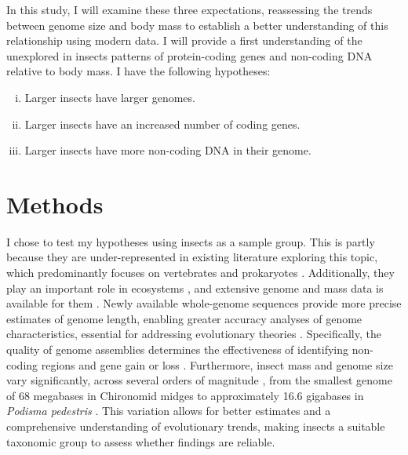 \documentclass[11pt]{article}
\begin{document}
In this study, I will examine these three expectations, reassessing the trends between genome size and body mass to establish a better understanding of this relationship using modern data. I will provide a first understanding of the unexplored in insects patterns of protein-coding genes and non-coding DNA relative to body mass. I have the following hypotheses:
\vspace{-0.25cm}
\begin{enumerate}[(i)]
    \setlength\itemsep{-0.1cm}
    \item Larger insects have larger genomes.
    \item Larger insects have an increased number of coding genes.
    \item Larger insects have more non-coding DNA in their genome.
\end{enumerate}

\pagebreak
\section{Methods}
I chose to test my hypotheses using insects as a sample group. This is partly because they are under-represented in existing literature exploring this topic, which predominantly focuses on vertebrates and prokaryotes \citep{genomeandmetabolism}. Additionally, they play an important role in ecosystems \citep{role-of-insects}, and extensive genome and mass data is available for them \citep{insectbase}. Newly available whole-genome sequences provide more precise estimates of genome length, enabling greater accuracy analyses of genome characteristics, essential for addressing evolutionary theories \citep{wgs}. Specifically, the quality of genome assemblies determines the effectiveness of identifying non-coding regions and gene gain or loss \citep{telomeres}.  Furthermore, insect mass and genome size vary significantly, across several orders of magnitude \citep{massvariation}, from the smallest genome of 68 megabases in Chironomid midges to approximately 16.6 gigabases in \textit{Podisma pedestris} \citep{smallest-genome, podisma}. This variation allows for better estimates and a comprehensive understanding of evolutionary trends, making insects a suitable taxonomic group to assess whether findings are reliable.
\end{document}
